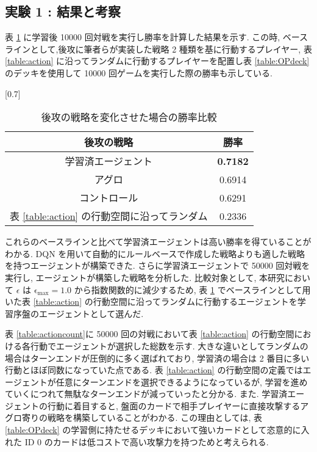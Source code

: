 \documentclass[twocolumn]{jarticle}     %
\begin{document}
     \subsection{実験 1 : 結果と考察}
     表 \ref{table:winratejikken1} に学習後 10000 回対戦を実行し勝率を計算した結果を示す. この時, ベースラインとして,後攻に筆者らが実装した戦略 2 種類を基に行動するプレイヤー, 表 \ref{table:action} に沿ってランダムに行動するプレイヤーを配置し表 \ref{table:OPdeck} のデッキを使用して 10000 回ゲームを実行した際の勝率も示している. 
     \begin{table}[t]
       \centering
       \caption{後攻の戦略を変化させた場合の勝率比較}
       \vspace{-0.3cm}
       \label{table:winratejikken1}
       \scalebox{0.7}[0.7]{
         \begin{tabular}{|c|c|}
            \hline
            後攻の戦略        & 勝率     \\ \hline \hline
            学習済エージェント    & \textbf{0.7182} \\ \hline
            アグロ          & 0.6914 \\ \hline
            コントロール       & 0.6291 \\ \hline
            表 \ref{table:action} の行動空間に沿ってランダム & 0.2336       \\ \hline
            \end{tabular}
       }
       \end{table}
       これらのベースラインと比べて学習済エージェントは高い勝率を得ていることがわかる. DQN を用いて自動的にルールベースで作成した戦略よりも適した戦略を持つエージェントが構築できた.
       さらに学習済エージェントで 50000 回対戦を実行し, エージェントが構築した戦略を分析した.
       比較対象として, 本研究において $\epsilon$ は $\mathrm{\epsilon_{max}} = 1.0$ から指数関数的に減少するため, 表 \ref{table:winratejikken1} でベースラインとして用いた表 \ref{table:action} の行動空間に沿ってランダムに行動するエージェントを学習序盤のエージェントとして選んだ.\par 
       表 \ref{table:actioncount}に 50000 回の対戦において表 \ref{table:action} の行動空間における各行動でエージェントが選択した総数を示す. 大きな違いとしてランダムの場合はターンエンドが圧倒的に多く選ばれており, 学習済の場合は 2 番目に多い行動とほぼ同数になっていた点である. 表 \ref{table:action} の行動空間の定義ではエージェントが任意にターンエンドを選択できるようになっているが, 学習を進めていくにつれて無駄なターンエンドが減っていったと分かる.
       また. 学習済エージェントの行動に着目すると, 盤面のカードで相手プレイヤーに直接攻撃するアグロ寄りの戦略を構築していることがわかる. この理由としては, 表 \ref{table:OPdeck} の学習側に持たせるデッキにおいて強いカードとして恣意的に入れた ID 0 のカードは低コストで高い攻撃力を持つためと考えられる. \par
\end{document}
